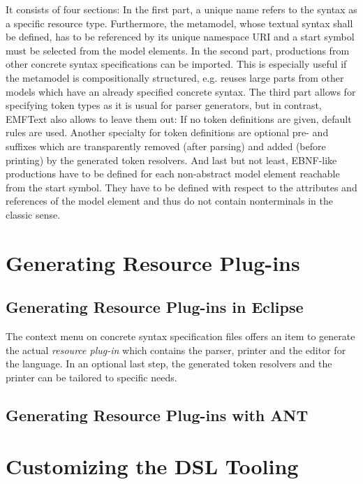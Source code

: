 It consists of four sections: In the first part, a unique
name refers to the syntax as a specific resource type. Furthermore, the metamodel, 
whose textual syntax shall be defined, has 
to be referenced by its  unique namespace URI and a start symbol must be selected from 
the model elements. In the second part, productions from other concrete syntax 
specifications can be imported. This is especially useful if the metamodel is 
compositionally structured, e.g. reuses large parts from other models which have an 
already specified concrete syntax.  The third part allows for specifying token types as
 it is usual for parser generators, but in contrast, EMFText also allows to leave them 
 out: If no token definitions are given, default rules are used. Another specialty for 
 token definitions are optional pre- and suffixes which are transparently removed (after 
 parsing) and added (before printing) by the generated token resolvers. And last but 
 not least, EBNF-like productions have to be defined for each non-abstract model element 
 reachable from the start symbol. They have to be defined with respect to the attributes 
 and references of the model element and thus do not contain nonterminals in the classic 
 sense.

\section{Generating Resource Plug-ins}
\label{sec:process_generating}

\subsection{Generating Resource Plug-ins in Eclipse}

The context menu on concrete syntax specification files offers an item to generate the 
actual \emph{resource plug-in} which contains the parser, printer and the editor
for the language. In an optional last step, the generated token resolvers and the printer 
can be tailored to specific needs.

\subsection{Generating Resource Plug-ins with ANT}

\section{Customizing the DSL Tooling}

